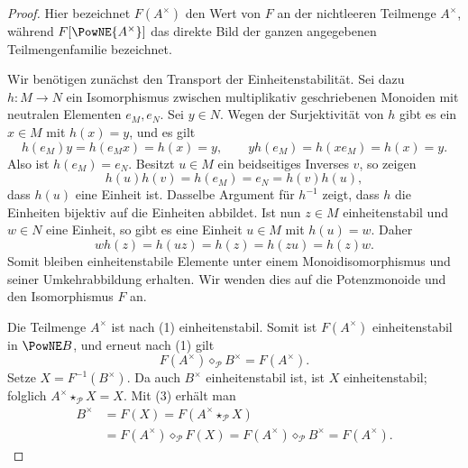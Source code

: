 \documentclass[main.tex]{subfiles}
\begin{document}
\newpage
{}
\begin{proof}
Hier bezeichnet \(F(A^\times)\) den Wert von \(F\) an der nichtleeren
Teilmenge \(A^\times\), während
\(F[\PowNE{A^\times}]\) das direkte Bild der ganzen angegebenen
Teilmengenfamilie bezeichnet.

Wir benötigen zunächst den Transport der Einheitenstabilität.  Sei dazu
\(h\colon M\to N\) ein Isomorphismus zwischen multiplikativ geschriebenen
Monoiden mit neutralen Elementen \(e_M,e_N\).  Sei \(y\in N\).  Wegen der
Surjektivität von \(h\) gibt es ein \(x\in M\) mit \(h(x)=y\), und es gilt
\[
  h(e_M)y=h(e_Mx)=h(x)=y,
  \qquad
  yh(e_M)=h(xe_M)=h(x)=y.
\]
Also ist \(h(e_M)=e_N\).  Besitzt \(u\in M\) ein beidseitiges Inverses
\(v\), so zeigen
\[
  h(u)h(v)=h(e_M)=e_N=h(v)h(u),
\]
dass \(h(u)\) eine Einheit ist.  Dasselbe Argument für \(h^{-1}\) zeigt,
dass \(h\) die Einheiten bijektiv auf die Einheiten abbildet.  Ist nun
\(z\in M\) einheitenstabil und \(w\in N\) eine Einheit, so gibt es eine
Einheit \(u\in M\) mit \(h(u)=w\).  Daher
\[
  wh(z)=h(uz)=h(z)=h(zu)=h(z)w.
\]
Somit bleiben einheitenstabile Elemente unter einem Monoidisomorphismus und
seiner Umkehrabbildung erhalten.  Wir wenden dies auf die Potenzmonoide und
den Isomorphismus \(F\) an.

Die Teilmenge \(A^\times\) ist nach (1)
einheitenstabil.  Somit ist \(F(A^\times)\) einheitenstabil in
\(\PowNE B\), und erneut nach (1) gilt
\[
  F(A^\times)\diamond_{\mathcal P}B^\times=F(A^\times).       \tag{3}
\]
Setze \(X=F^{-1}(B^\times)\).  Da auch \(B^\times\) einheitenstabil ist,
ist \(X\) einheitenstabil; folglich
\(A^\times\star_{\mathcal P}X=X\).  Mit (3) erhält man
\[
\begin{aligned}
  B^\times
    &=F(X)
      =F(A^\times\star_{\mathcal P}X)\\
    &=F(A^\times)\diamond_{\mathcal P}F(X)
      =F(A^\times)\diamond_{\mathcal P}B^\times
      =F(A^\times).
\end{aligned}                                                   \tag{4}
\]


\end{proof}
\end{document}
